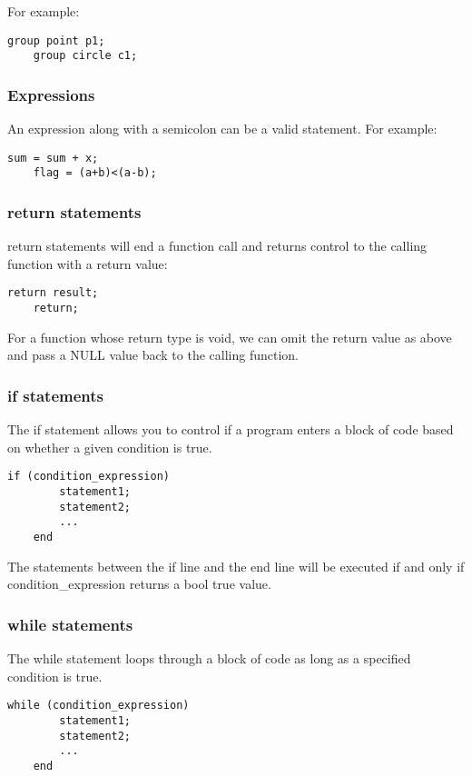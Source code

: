 \documentclass[11pt,letterpaper]{article}
\begin{document}
For example:
\begin{lstlisting}[tabsize=4]
	group point p1;
	group circle c1;
\end{lstlisting}

\subsubsection {Expressions}
An expression along with a semicolon can be a valid statement. For example:
\begin{lstlisting}[tabsize=4]
	sum = sum + x;
	flag = (a+b)<(a-b);
\end{lstlisting}

\subsubsection {return statements}
return statements will end a function call and returns control to the calling function with a return value:
\begin{lstlisting}[tabsize=4]
	return result;
	return;
\end{lstlisting}

For a function whose return type is void, we can omit the return value as above and pass a NULL value back to the calling function.


\subsubsection {if statements}
The if statement allows you to control if a program enters a block of code based on whether a given condition is true. 

\begin{lstlisting}[tabsize=4]
	if (condition_expression)
   		statement1;
   		statement2;
		...
	end
\end{lstlisting}

The statements between the if line and the end line will be executed if and only if condition\_expression returns a bool true value.

\subsubsection {while statements}
The while statement loops through a block of code as long as a specified condition is true.

\begin{lstlisting}[tabsize=4]
	while (condition_expression)
   		statement1;
	   	statement2;
		...
	end
\end{lstlisting}
\end{document}
